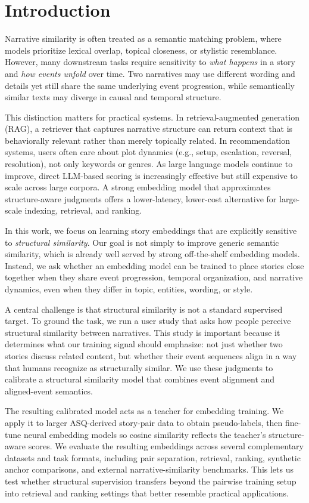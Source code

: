 \section{Introduction}

Narrative similarity is often treated as a semantic matching problem, where models prioritize lexical overlap, topical closeness, or stylistic resemblance. However, many downstream tasks require sensitivity to \emph{what happens} in a story and \emph{how events unfold} over time. Two narratives may use different wording and details yet still share the same underlying event progression, while semantically similar texts may diverge in causal and temporal structure.

This distinction matters for practical systems. In retrieval-augmented generation (RAG), a retriever that captures narrative structure can return context that is behaviorally relevant rather than merely topically related. In recommendation systems, users often care about plot dynamics (e.g., setup, escalation, reversal, resolution), not only keywords or genres. As large language models continue to improve, direct LLM-based scoring is increasingly effective but still expensive to scale across large corpora. A strong embedding model that approximates structure-aware judgments offers a lower-latency, lower-cost alternative for large-scale indexing, retrieval, and ranking.

In this work, we focus on learning story embeddings that are explicitly sensitive to \emph{structural similarity}. Our goal is not simply to improve generic semantic similarity, which is already well served by strong off-the-shelf embedding models. Instead, we ask whether an embedding model can be trained to place stories close together when they share event progression, temporal organization, and narrative dynamics, even when they differ in topic, entities, wording, or style.

A central challenge is that structural similarity is not a standard supervised target. To ground the task, we run a user study that asks how people perceive structural similarity between narratives. This study is important because it determines what our training signal should emphasize: not just whether two stories discuss related content, but whether their event sequences align in a way that humans recognize as structurally similar. We use these judgments to calibrate a structural similarity model that combines event alignment and aligned-event semantics.

The resulting calibrated model acts as a teacher for embedding training. We apply it to larger ASQ-derived story-pair data to obtain pseudo-labels, then fine-tune neural embedding models so cosine similarity reflects the teacher's structure-aware scores. We evaluate the resulting embeddings across several complementary datasets and task formats, including pair separation, retrieval, ranking, synthetic anchor comparisons, and external narrative-similarity benchmarks. This lets us test whether structural supervision transfers beyond the pairwise training setup into retrieval and ranking settings that better resemble practical applications.

